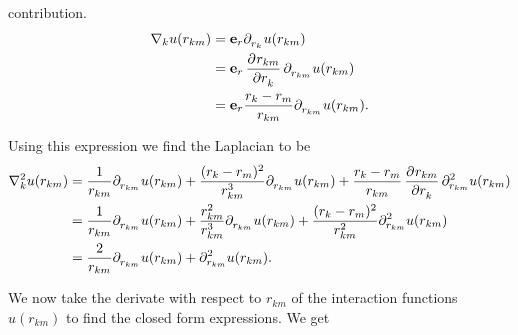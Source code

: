 \documentclass[
    a4paper, aps, twocolumn, floatfix, superscriptaddress]{revtex4-1}
\newcommand{\vf}{\mathbf}
\newcommand{\1}{\mathds{1}}
\newcommand{\tpl}[1]{\tensor{\partial}{_#1}} %
\begin{document}
            contribution.
            \begin{align}
                \nabla_k u(r_{km})
                &=
                \vf{e}_{r}\tpl{{r_k}}u(r_{km})
                \\
                &=
                \vf{e}_r\dpd[]{r_{km}}{r_k}\tpl{{r_{km}}}u(r_{km})
                \\
                &= \vf{e}_r\frac{r_k - r_m}{r_{km}}
                \tpl{{r_{km}}}u(r_{km}).
            \end{align}
            \begin{widetext}
                Using this expression we find the Laplacian to be
                \begin{align}
                    \nabla_k^2 u(r_{km})
                    &=
                    \frac{1}{r_{km}} \tpl{{r_{km}}} u(r_{km})
                    + \frac{(r_k - r_m)^2}{r_{km}^3} \tpl{{r_{km}}} u(r_{km})
                    +
                    \frac{r_k - r_m}{r_{km}}
                    \dpd[]{r_{km}}{r_k}
                    \partial_{{r_{km}}}^2 u(r_{km}) \\
                    &=
                    \frac{1}{r_{km}} \tpl{{r_{km}}} u(r_{km})
                    + \frac{r_{km}^2}{r_{km}^3} \tpl{{r_{km}}} u(r_{km})
                    +
                    \frac{(r_k - r_m)^2}{r_{km}^2}
                    \partial_{{r_{km}}}^2 u(r_{km}) \\
                    &=
                    \frac{2}{r_{km}}\tpl{{r_{km}}}u(r_{km})
                    + \partial_{{r_{km}}}^2u(r_{km}).
                \end{align}
            \end{widetext}
            We now take the derivate with respect to $r_{km}$ of the interaction
            functions $u(r_{km})$ to find the closed form expressions. We get
\end{document}
